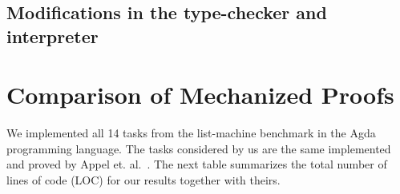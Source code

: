 \documentclass[review]{elsarticle}
\theoremstyle{definition}
\begin{document}
\subsection{Modifications in the type-checker and interpreter}\label{sec:changesintep}


\section{Comparison of Mechanized Proofs}\label{sec:comparison}

We implemented all 14 tasks from the list-machine benchmark in the Agda programming language.
The tasks considered by us are the same implemented and proved by Appel et. al.~\cite{Appel07}.
The next table summarizes the total number of lines of code (LOC) for our results together with theirs.
\end{document}
